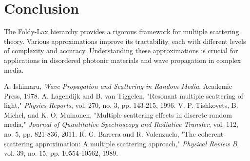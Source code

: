 \documentclass{article}
\begin{document}
	\section{Conclusion}
	The Foldy-Lax hierarchy provides a rigorous framework for multiple scattering theory. Various approximations improve its tractability, each with different levels of complexity and accuracy. Understanding these approximations is crucial for applications in disordered photonic materials and wave propagation in complex media.
	
	
	\begin{thebibliography}{9}
		 A. Ishimaru, \textit{Wave Propagation and Scattering in Random Media}, Academic Press, 1978.
		 A. Lagendijk and B. van Tiggelen, "Resonant multiple scattering of light," \textit{Physics Reports}, vol. 270, no. 3, pp. 143-215, 1996.
		 V. P. Tishkovets, B. Michel, and K. O. Muinonen, "Multiple scattering effects in discrete random media," \textit{Journal of Quantitative Spectroscopy and Radiative Transfer}, vol. 112, no. 5, pp. 821-836, 2011.
		 R. G. Barrera and R. Valenzuela, "The coherent scattering approximation: A multiple scattering approach," \textit{Physical Review B}, vol. 39, no. 15, pp. 10554-10562, 1989.
	\end{thebibliography}
	
\end{document}

